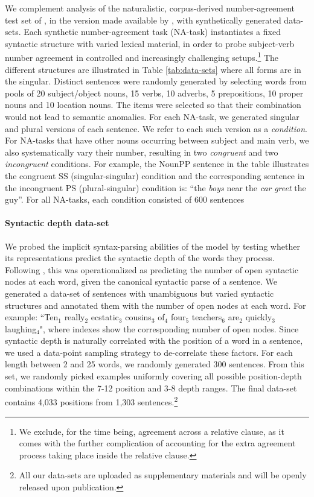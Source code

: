 We complement analysis of the naturalistic, corpus-derived
number-agreement test set of , in the
version made available by , with
synthetically generated data-sets. Each synthetic number-agreement
task (NA-task) instantiates a fixed syntactic structure with varied
lexical material, in order to probe subject-verb number agreement in
controlled and increasingly challenging setups.\footnote{We exclude,
  for the time being, agreement across a relative clause, as it comes
  with the further complication of accounting for the extra agreement
  process taking place inside the relative clause.} The different
structures are illustrated in Table \ref{tab:data-sets} where all forms are in the singular. Distinct sentences were randomly
generated by selecting words from pools of 20
subject/object nouns, 15 verbs, 10 adverbs, 5 prepositions, 10 proper
nouns and 10 location nouns. The items were selected so that their
combination would not lead to semantic anomalies. For each NA-task, we
generated singular and plural versions of each sentence. We refer to
each such version as a \textit{condition}. For NA-tasks that have
other nouns occurring between subject and main verb, we also
systematically vary their number, resulting in two \textit{congruent}
and two \textit{incongruent} conditions. For example, the NounPP
sentence in the table illustrates the congruent SS (singular-singular)
condition and the corresponding sentence in the incongruent PS
(plural-singular) condition is: ``the \emph{boys} near the \emph{car}
\emph{greet} the guy''. For all NA-tasks, each condition consisted of
600 sentences

\paragraph{Syntactic depth data-set} We probed the implicit
syntax-parsing abilities of the model by testing whether its representations
predict the syntactic depth of the words they process. Following
, this was operationalized as predicting the
number of open syntactic nodes at each word, given the canonical
syntactic parse of a sentence.  We generated a data-set of sentences with
unambiguous but varied syntactic structures and annotated them with the number of open nodes at each word. For example:
``Ten$_1$ really$_2$ ecstatic$_3$ cousins$_3$ of$_4$ four$_5$ teachers$_6$
are$_2$ quickly$_3$ laughing$_4$", where indexes show the corresponding
number of open nodes.
Since syntactic depth is
naturally correlated with the position of a word in a sentence, we
used a data-point sampling strategy to de-correlate these factors. For
each length between 2 and 25 words, we randomly generated 300
sentences. From this set, we randomly picked examples uniformly
covering all possible position-depth combinations within the 7-12
position and 3-8 depth ranges. The final data-set contains 4,033
positions from 1,303 sentences.\footnote{All our data-sets are
  uploaded as supplementary materials and will be openly released upon
  publication.}